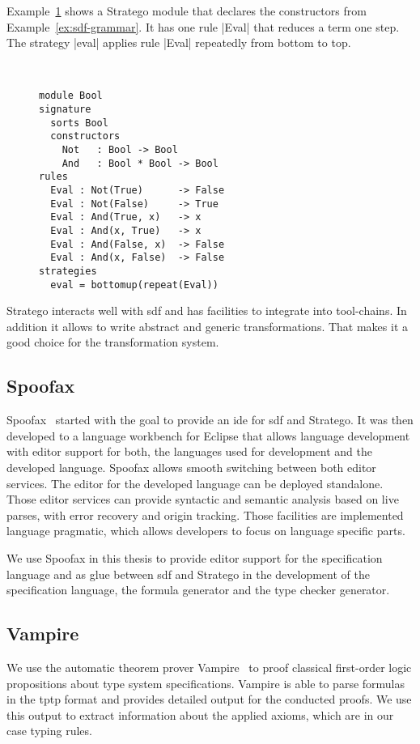 Example~\ref{ex:stratego-module} shows a Stratego module that declares
the constructors from Example~\ref{ex:sdf-grammar}. It has one rule
\code|Eval| that reduces a term one step. The strategy \code|eval|
applies rule \code|Eval| repeatedly from bottom to top.

\begin{figure}
\begin{example}{~}
\begin{lstlisting}[language=stratego]
module Bool
signature
  sorts Bool
  constructors
    Not   : Bool -> Bool 
    And   : Bool * Bool -> Bool
rules
  Eval : Not(True)      -> False
  Eval : Not(False)     -> True
  Eval : And(True, x)   -> x
  Eval : And(x, True)   -> x
  Eval : And(False, x)  -> False
  Eval : And(x, False)  -> False
strategies
  eval = bottomup(repeat(Eval))
\end{lstlisting}
\label{ex:stratego-module}
\end{example}
\end{figure}

Stratego interacts well with \gls{sdf} and has facilities to integrate
into tool-chains. In addition it allows to write abstract and generic
transformations. That makes it a good choice for the transformation
system.

\subsection{Spoofax}
Spoofax~\cite{KatsV10} started with the goal to provide an \gls{ide}
for \gls{sdf} and Stratego. It was then developed to a language
workbench for Eclipse that allows language development with editor
support for both, the languages used for development and the developed
language. Spoofax allows smooth switching between both editor
services. The editor for the developed language can be deployed
standalone. Those editor services can provide syntactic and semantic
analysis based on live parses, with error recovery and origin
tracking. Those facilities are implemented language pragmatic, which
allows developers to focus on language specific parts.

We use Spoofax in this thesis to provide editor support for the
specification language and as glue between \gls{sdf} and Stratego in
the development of the specification language, the formula generator
and the type checker generator.

\subsection{Vampire}
We use the automatic theorem prover Vampire~\cite{VoronkovVampire} to
proof classical first-order logic propositions about type system
specifications. Vampire is able to parse formulas in the \gls{tptp}
format and provides detailed output for the conducted proofs. We use
this output to extract information about the applied axioms, which are
in our case typing rules.


